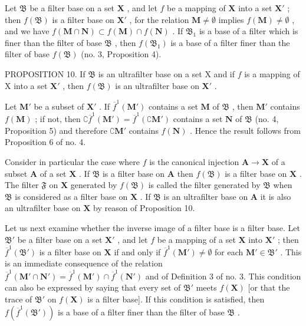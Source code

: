 Let \(\mathfrak{B}\) be a filter base on a set \(\mathbf{X}\) , and let \(f\) be a mapping of \(\mathbf{X}\) into a set \(\mathbf{X}'\) ; then \(f(\mathfrak{B})\) is a filter base on \(\mathbf{X}'\) , for the relation \(\mathbf{M} \neq \emptyset\) implies \(f(\mathbf{M}) \neq \emptyset\) , and we have \(f(\mathbf{M} \cap \mathbf{N}) \subset f(\mathbf{M}) \cap f(\mathbf{N})\) . If \(\mathfrak{B}_1\) is a base of a filter which is finer than the filter of base \(\mathfrak{B}\) , then \(f(\mathfrak{B}_1)\) is a base of a filter finer than the filter of base \(f(\mathfrak{B})\) (no. 3, Proposition 4).

PROPOSITION 10. If \(\mathfrak{B}\) is an ultrafilter base on a set X and if \(f\) is a mapping of X into a set \(\mathbf{X}'\) , then \(f(\mathfrak{B})\) is an ultrafilter base on \(\mathbf{X}'\) .

Let \(\mathbf{M}'\) be a subset of \(\mathbf{X}'\) . If \(\overline{f}^{1}(\mathbf{M}')\) contains a set \(\mathbf{M}\) of \(\mathfrak{B}\) , then \(\mathbf{M}'\) contains \(f(\mathbf{M})\) ; if not, then \(\complement \overline{f}^{1}(\mathbf{M}') = \overline{f}^{1}(\complement \mathbf{M}')\) contains a set \(\mathbf{N}\) of \(\mathfrak{B}\) (no. 4, Proposition 5) and therefore \(\complement \mathbf{M}'\) contains \(f(\mathbf{N})\) . Hence the result follows from Proposition 6 of no. 4.

Consider in particular the case where \(f\) is the canonical injection \(\mathbf{A} \to \mathbf{X}\) of a subset \(\mathbf{A}\) of a set \(\mathbf{X}\) . If \(\mathfrak{B}\) is a filter base on \(\mathbf{A}\) then \(f(\mathfrak{B})\) is a filter base on \(\mathbf{X}\) . The filter \(\mathfrak{F}\) on \(\mathbf{X}\) generated by \(f(\mathfrak{B})\) is called the filter generated by \(\mathfrak{B}\) when \(\mathfrak{B}\) is considered as a filter base on \(\mathbf{X}\) . If \(\mathfrak{B}\) is an ultrafilter base on \(\mathbf{A}\) it is also an ultrafilter base on \(\mathbf{X}\) by reason of Proposition 10.

Let us next examine whether the inverse image of a filter base is a filter base. Let \(\mathfrak{B}'\) be a filter base on a set \(\mathbf{X}'\) , and let \(f\) be a mapping of a set \(\mathbf{X}\) into \(\mathbf{X}'\) ; then \(\overline{f}^{1}(\mathfrak{B}')\) is a filter base on \(\mathbf{X}\) if and only if \(\overline{f}^{1}(\mathbf{M}') \neq \emptyset\) for each \(\mathbf{M}' \in \mathfrak{B}'\) . This is an immediate consequence of the relation \(\overline{f}^{1}(\mathbf{M}' \cap \mathbf{N}') = \overline{f}^{1}(\mathbf{M}') \cap \overline{f}^{1}(\mathbf{N}')\) and of Definition 3 of no. 3. This condition can also be expressed by saying that every set of \(\mathfrak{B}'\) meets \(f(\mathbf{X})\) {[}or that the trace of \(\mathfrak{B}'\) on \(f(\mathbf{X})\) is a filter base{]}. If this condition is satisfied, then \(f(\overline{f}^{1}(\mathfrak{B}'))\) is a base of a filter finer than the filter of base \(\mathfrak{B}\) .

